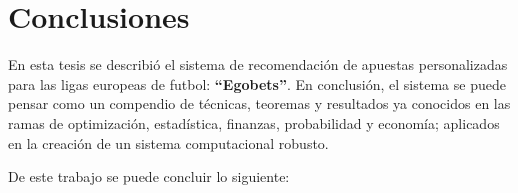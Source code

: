 %
\chapter{Conclusiones}

En esta tesis se describió el sistema de recomendación de apuestas personalizadas para las ligas europeas de futbol: \textbf{``Egobets''}. En conclusión, el sistema se puede pensar como un compendio de técnicas, teoremas y resultados ya conocidos en las ramas de optimización, estadística, finanzas, probabilidad y economía; aplicados en la creación de un sistema computacional robusto.

De este trabajo se puede concluir lo siguiente:




